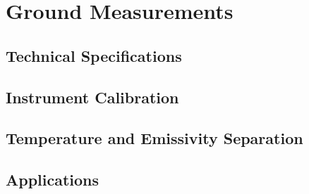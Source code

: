 \chapter{Ground Measurements}

\section{Technical Specifications}

\section{Instrument Calibration}

\section{Temperature and Emissivity Separation}

\section{Applications}
